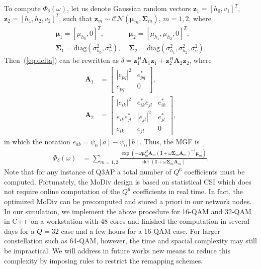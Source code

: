 \documentclass[journal]{IEEEtran}
\begin{document}
To compute $\Phi_{\delta}(\omega)$, let us denote Gaussian random vectors
$\mathbf{z}_1 = [h_0, v_1]^T$, $\mathbf{z}_{2} = [h_1, h_2, v_2]^T$, such
that $\mathbf{z}_m\sim\mathcal{CN}(\bm{\mu}_m, \mathbf{\Sigma}_m)$, $m=1,2$,
where
\begin{align}
    \bm{\mu}_1 = [\mu_{h_0}, 0]^T,& \; \bm{\mu}_{2} = [\mu_{h_1}, \mu_{h_2},
    0]^T,
    \\
    \mathbf{\Sigma}_1 = \mbox{diag}\left(\sigma_{h_0}^2, \sigma_v^2\right), & \;
    \mathbf{\Sigma}_2 = \mbox{diag}\left(\sigma_{h_1}^2, \sigma_{h_2}^2,
    \sigma_v^2\right).
\end{align}
Then~(\ref{eq:delta}) can be rewritten as $\delta =
\mathbf{z}_1^H\mathbf{A}_1\mathbf{z}_1 +
\mathbf{z}_{2}^H\mathbf{A}_{2}\mathbf{z}_{2}$, where
\begin{subequations}
    \begin{align}
        \mathbf{A}_1 & = \left[
            \begin{array}{cc}
                |e_{pq}|^2  & e_{pq}^* \\
                e_{pq} & 0
            \end{array}
        \right], \\
        \mathbf{A}_2 & = \left[
            \begin{array}{ccc}
            |e_{ik}|^2 & e_{ik}^*e_{jl} & e_{ik}^*
            \\
            e_{ik}e_{jl}^* & |e_{jl}|^2 & e_{jl}^*
            \\
            e_{ik} & e_{jl} & 0
        \end{array}
        \right],
    \end{align}
\end{subequations}
in which the notation $e_{ab} = \psi_0[a] - \psi_0[b]$. Thus, the MGF is
\begin{align}
    \Phi_{\delta}(\omega) & = \sum_{m=1,2}
    \frac{\exp(-\omega\bm{\mu}_m^H\mathbf{A}_m(\mathbf{I} +
    \omega\mathbf{\Sigma}_m\mathbf{A}_m)^{-1}\bm{\mu}_m)}{\det(\mathbf{I} +
    \omega\mathbf{\Sigma}_m\mathbf{A}_m)}.
\end{align}
Note that for any instance of Q3AP a total number of $Q^6$ coefficients must be
computed. Fortunately, the MoDiv design is based on statistical CSI which does
not require online computation of the $Q^6$ coefficients in real time. In fact,
the optimized MoDiv can be precomputed and stored a priori in our network nodes.
In our simulation, we implement the above procedure for 16-QAM and 32-QAM
in C++ on a workstation with 48 cores and finished the computation in several
days for a $Q=32$ case and a few hours for a 16-QAM case. For larger
constellation such as 64-QAM, however, the time and spacial complexity may still
be impractical. We will address in future works new means to reduce this complexity by 
imposing rules to restrict the remapping schemes.
\end{document}

